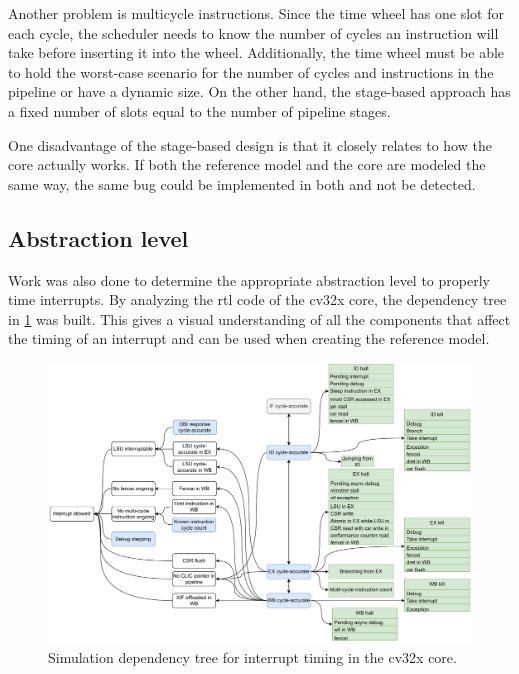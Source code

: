 Another problem is multicycle instructions. Since the time wheel has one slot for each cycle, the scheduler needs to know the number of cycles an instruction will take before inserting it into the wheel. Additionally, the time wheel must be able to hold the worst-case scenario for the number of cycles and instructions in the pipeline or have a dynamic size. On the other hand, the stage-based approach has a fixed number of slots equal to the number of pipeline stages. 

One disadvantage of the stage-based design is that it closely relates to how the core actually works. If both the reference model and the core are modeled the same way, the same bug could be implemented in both and not be detected.


\subsection{Abstraction level}

Work was also done to determine the appropriate abstraction level to properly time interrupts. By analyzing the \acrshort{rtl} code of the \gls{cv32x} core, the dependency tree in \cref{fig:dependency-tree-cv32x} was built. This gives a visual understanding of all the components that affect the timing of an interrupt and can be used when creating the reference model.

\begin{figure}[htb]
    \centering
    \includegraphics[width=1.0\linewidth]{figures/dependency_tree_full.pdf}
    \caption{Simulation dependency tree for interrupt timing in the \gls{cv32x} core.}
    \label{fig:dependency-tree-cv32x}
\end{figure}

